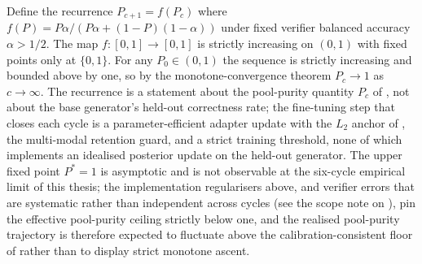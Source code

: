 \begin{remark}
\label{thm:bayes-convergence}
Define the recurrence $P_{c+1} = f(P_c)$ where $f(P) = P \alpha / (P \alpha + (1-P)(1-\alpha))$ under fixed verifier balanced accuracy $\alpha > 1/2$. The map $f: [0,1] \to [0,1]$ is strictly increasing on $(0,1)$ with fixed points only at $\{0, 1\}$. For any $P_0 \in (0, 1)$ the sequence is strictly increasing and bounded above by one, so by the monotone-convergence theorem $P_c \to 1$ as $c \to \infty$. The recurrence is a statement about the pool-purity quantity $P_c$ of , not about the base generator's held-out correctness rate; the fine-tuning step that closes each cycle is a parameter-efficient adapter update with the $L_2$ anchor of , the multi-modal retention guard, and a strict training threshold, none of which implements an idealised posterior update on the held-out generator. The upper fixed point $P^{*} = 1$ is asymptotic and is not observable at the six-cycle empirical limit of this thesis; the implementation regularisers above, and verifier errors that are systematic rather than independent across cycles (see the scope note on ), pin the effective pool-purity ceiling strictly below one, and the realised pool-purity trajectory is therefore expected to fluctuate above the calibration-consistent floor of  rather than to display strict monotone ascent.
\end{remark}


